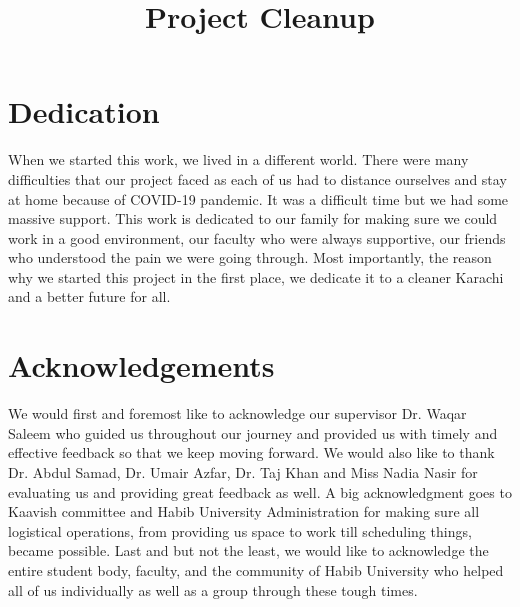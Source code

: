 \documentclass[12pt,twosided]{report}
\title{Project Cleanup}
\begin{document}

\chapter*{Dedication}
When we started this work, we lived in a different world. There were many difficulties that our project faced as each of us had to distance ourselves and stay at home because of COVID-19 pandemic. It was a difficult time but we had some massive support. This work is dedicated to our family for making sure we could work in a good environment, our faculty who were always supportive, our friends who understood the pain we were going through. Most importantly, the reason why we started this project in the first place, we dedicate it to a cleaner Karachi and a better future for all.


\chapter*{Acknowledgements}
We would first and foremost like to acknowledge our supervisor Dr. Waqar Saleem who guided us throughout our journey and provided us with timely and effective feedback so that we keep moving forward. We would also like to thank Dr. Abdul Samad, Dr. Umair Azfar, Dr. Taj Khan and Miss Nadia Nasir for evaluating us and providing great feedback as well. A big acknowledgment goes to Kaavish committee and Habib University Administration for making sure all logistical operations, from providing us space to work till scheduling things, became possible. Last and but not the least, we would like to acknowledge the entire student body, faculty, and the community of Habib University who helped all of us individually as well as a group through these tough times.
\end{document}
